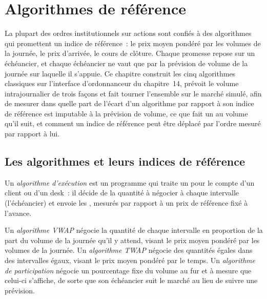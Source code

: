 \chapter{Algorithmes de référence}\label{ch:mx:benchmark-algorithms}

La plupart des ordres institutionnels sur actions sont confiés à des algorithmes qui promettent un indice de référence~: le prix moyen pondéré par les volumes de la journée, le prix d'arrivée, le cours de clôture.
Chaque promesse repose sur un échéancier, et chaque échéancier ne vaut que par la prévision de volume de la journée sur laquelle il s'appuie. Ce chapitre construit les cinq algorithmes classiques sur
l'interface d'ordonnanceur du chapitre~14, prévoit le volume intrajournalier de trois façons et fait tourner l'ensemble sur le marché simulé, afin de mesurer dans quelle part de l'écart
d'un algorithme par rapport à son indice de référence est imputable à la prévision de volume, ce que fait un  au volume qu'il suit, et comment
un indice de référence peut être déplacé par l'ordre mesuré par rapport à lui.

\section{Les algorithmes et leurs indices de référence}

\begin{definition}\label{def:mx:benchmark-algorithms:algo}
Un \emph{algorithme d'exécution} est un programme qui traite un  pour le compte d'un client ou d'un desk~: il décide de la quantité à négocier
à chaque intervalle (l'échéancier) et envoie les , mesurés par rapport à un prix de référence fixé à l'avance.
\end{definition}

\begin{definition}\label{def:mx:benchmark-algorithms:vwap}
Un \emph{algorithme VWAP} négocie la quantité de chaque intervalle en proportion de la part du volume de la journée qu'il y attend, visant
le prix moyen pondéré par les volumes de la journée. Un \emph{algorithme TWAP} négocie des quantités égales dans des intervalles égaux, visant le
prix moyen pondéré par le temps. Un \emph{algorithme de participation} négocie un pourcentage fixe du volume au fur et à mesure que celui-ci s'affiche,
de sorte que son échéancier suit le marché au lieu de suivre une prévision.
\end{definition}

